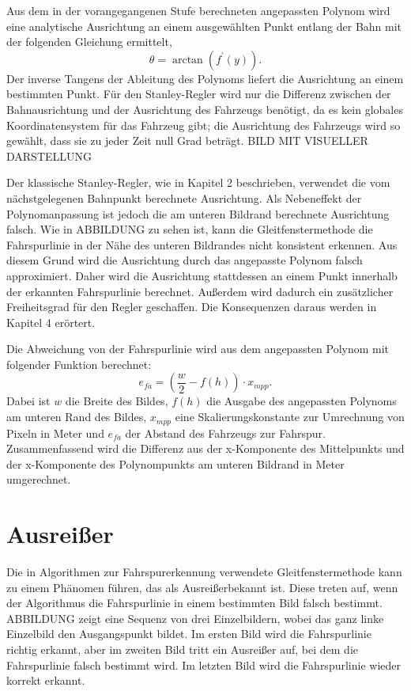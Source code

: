 \documentclass[arbeit=studie,oneside,BCOR=12mm]{ArbeitRST}
\begin{document}
Aus dem in der vorangegangenen Stufe berechneten angepassten Polynom wird eine
analytische Ausrichtung an einem ausgewählten Punkt entlang der Bahn mit der
folgenden Gleichung ermittelt, \begin{equation} \theta = \arctan(f^\prime(y)).
\end{equation} Der inverse Tangens der Ableitung des Polynoms liefert die
Ausrichtung an einem bestimmten Punkt. Für den Stanley-Regler wird nur die
Differenz zwischen der Bahnausrichtung und der Ausrichtung des Fahrzeugs
benötigt, da es kein globales Koordinatensystem für das Fahrzeug gibt; die
Ausrichtung des Fahrzeugs wird so gewählt, dass sie zu jeder Zeit null Grad
beträgt. BILD MIT VISUELLER DARSTELLUNG 

Der klassische Stanley-Regler, wie in Kapitel 2 beschrieben, verwendet die vom
nächstgelegenen Bahnpunkt berechnete Ausrichtung. Als Nebeneffekt der
Polynomanpassung ist jedoch die am unteren Bildrand berechnete Ausrichtung
falsch. Wie in ABBILDUNG zu sehen ist, kann die Gleitfenstermethode die
Fahrspurlinie in der Nähe des unteren Bildrandes nicht konsistent erkennen. Aus
diesem Grund wird die Ausrichtung durch das angepasste Polynom falsch
approximiert. Daher wird die Ausrichtung stattdessen an einem Punkt innerhalb
der erkannten Fahrspurlinie berechnet. Außerdem wird dadurch ein zusätzlicher
Freiheitsgrad für den Regler geschaffen. Die Konsequenzen daraus werden in
Kapitel 4 erörtert.

Die Abweichung von der Fahrspurlinie wird aus dem angepassten Polynom mit
folgender Funktion berechnet: 
\begin{equation}
    e_{fa} = (\frac{w}{2} - f(h))\cdot x_{mpp}.
\end{equation}
Dabei ist $w$ die Breite des Bildes, $f(h)$ die Ausgabe des angepassten
Polynoms am unteren Rand des Bildes, $x_{mpp}$ eine Skalierungskonstante zur
Umrechnung von Pixeln in Meter und $e_{fa}$ der Abstand des Fahrzeugs zur
Fahrspur. Zusammenfassend wird die Differenz aus der x-Komponente des
Mittelpunkts und der x-Komponente des Polynompunkts am unteren Bildrand in
Meter umgerechnet.

\section{Ausrei{\ss}er}

Die in Algorithmen zur Fahrspurerkennung verwendete Gleitfenstermethode kann zu
einem Phänomen führen, das als \glqq Ausreißer\grqq bekannt ist. Diese treten auf, wenn
der Algorithmus die Fahrspurlinie in einem bestimmten Bild falsch bestimmt.
ABBILDUNG zeigt eine Sequenz von drei Einzelbildern, wobei das ganz linke
Einzelbild den Ausgangspunkt bildet. Im ersten Bild wird die Fahrspurlinie
richtig erkannt, aber im zweiten Bild tritt ein Ausreißer auf, bei dem die
Fahrspurlinie falsch bestimmt wird. Im letzten Bild wird die Fahrspurlinie
wieder korrekt erkannt.
\end{document}
